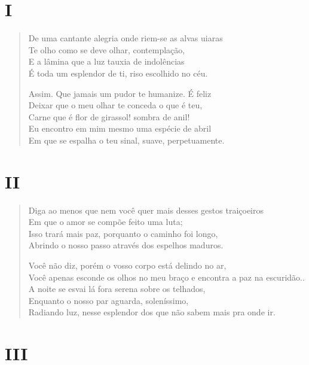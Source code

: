 \section{I}

\begin{verse}
De uma cantante alegria onde riem-se as alvas uiaras\\
Te olho como se deve olhar, contemplação,\\
E a lâmina que a luz tauxia de indolências\\
É toda um esplendor de ti, riso escolhido no céu.

Assim. Que jamais um pudor te humanize. É feliz\\
Deixar que o meu olhar te conceda o que é teu,\\
Carne que é flor de girassol! sombra de anil!\\
Eu encontro em mim mesmo uma espécie de abril\\
Em que se espalha o teu sinal, suave, perpetuamente.
\end{verse}

\medskip
\section{II}

\begin{verse}
Diga ao menos que nem você quer mais desses gestos traiçoeiros\\
Em que o amor se compõe feito uma luta;\\
Isso trará mais paz, porquanto o caminho foi longo,\\
Abrindo o nosso passo através dos espelhos maduros.

Você não diz, porém o vosso corpo está delindo no ar,\\
Você apenas esconde os olhos no meu braço e encontra a paz na escuridão..\\
A noite se esvai lá fora serena sobre os telhados,\\
Enquanto o nosso par aguarda, soleníssimo,\\
Radiando luz, nesse esplendor dos que não sabem mais pra onde ir.
\end{verse}

\medskip
\section{III}

